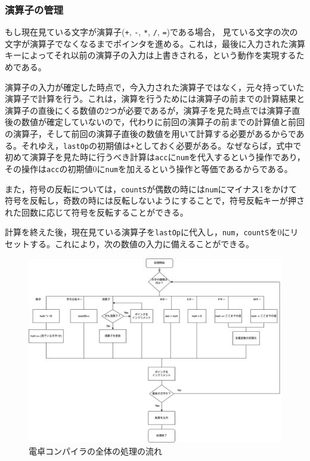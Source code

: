 \documentclass[a4paper]{jsarticle}
\newcommand{\var}[1]{\texttt{#1}}
\begin{document}
\subsubsection{演算子の管理}
もし現在見ている文字が演算子(\var{+}, \var{-}, \var{*}, \var{/}, \var{=})である場合，   見ている文字の次の文字が演算子でなくなるまでポインタを進める。これは，最後に入力された演算キーによってそれ以前の演算子の入力は上書きされる，という動作を実現するためである。

演算子の入力が確定した時点で，今入力された演算子ではなく，元々持っていた演算子で計算を行う。これは，演算を行うためには演算子の前までの計算結果と演算子の直後にくる数値の2つが必要であるが，演算子を見た時点では演算子直後の数値が確定していないので，代わりに前回の演算子の前までの計算値と前回の演算子，そして前回の演算子直後の数値を用いて計算する必要があるからである。それゆえ，\var{lastOp}の初期値は\var{+}としておく必要がある。なぜならば，式中で初めて演算子を見た時に行うべき計算は\var{acc}に\var{num}を代入するという操作であり，その操作は\var{acc}の初期値0に\var{num}を加えるという操作と等価であるからである。

また，符号の反転については，\var{countS}が偶数の時には\var{num}にマイナス1をかけて符号を反転し，奇数の時には反転しないようにすることで，符号反転キーが押された回数に応じて符号を反転することができる。

計算を終えた後，現在見ている演算子を\var{lastOp}に代入し，\var{num}，\var{countS}を0にリセットする。これにより，次の数値の入力に備えることができる。

\begin{figure}[H]
    \centering
    \includegraphics[width=15cm]{./overall-flow.drawio.png}
    \caption{電卓コンパイラの全体の処理の流れ}
    \label{fig:flowchart}
\end{figure}
\end{document}
